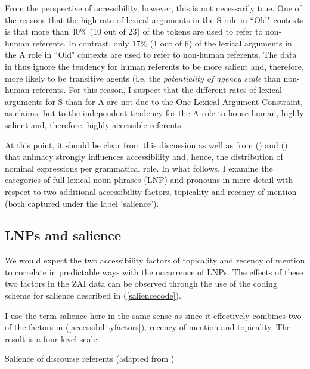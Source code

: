 From the perspective of accessibility, however, this is not necessarily true. One of the reasons that the high rate of lexical arguments in the S role in ``Old" contexts is that more than 40{\%} (10 out of 23) of the tokens are used to refer to non-human referents. In contrast, only 17{\%} (1 out of 6) of the lexical arguments in the A role in ``Old" contexts are used to refer to non-human referents. The data in  thus ignore the tendency for human referents to be more salient and, therefore, more likely to be transitive agents (i.e. the \textit{potentiality of agency scale} \citet{silverstein1976} than non-human referents. For this reason, I suspect that the different rates of lexical arguments for S than for A are not due to the One Lexical Argument Constraint, as \citet{arnold2003} claims, but to the independent tendency for the A role to house human, highly salient and, therefore, highly accessible referents.


At this point, it should be clear from this discussion as well as from  () and  () that animacy strongly influences accessibility and, hence, the distribution of nominal expressions per grammatical role. In what follows, I examine the categories of full lexical noun phrases (LNP) and pronouns in more detail with respect to two additional accessibility factors, topicality and recency of mention (both captured under the label `salience').


\subsection{LNPs and salience}\label{coding}

We would expect the two accessibility factors of topicality and recency of mention to correlate in predictable ways with the occurrence of LNPs. The effects of these two factors in the ZAI data can be observed through the use of the coding scheme for salience described in (\ref{saliencecode}). 

I use the term salience here in the same sense as \citet{arnold2003} since it effectively combines two of the factors in (\ref{accessibilityfactors}), recency of mention and topicality. The result is a four level scale:


\ea\label{saliencecode}  Salience of discourse referents (adapted from \citet[231]{arnold2003})

